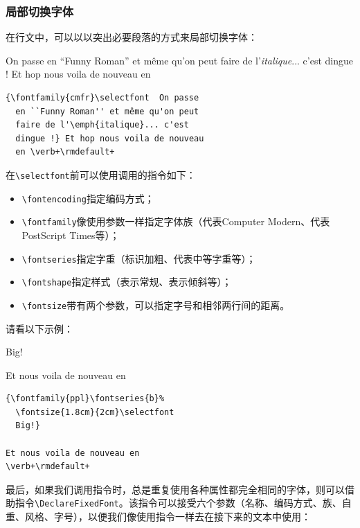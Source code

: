 \subsubsection{局部切换字体}

在行文中，可以以以突出必要段落的方式来局部切换字体：

\begin{codelist}[9.13]{
    { \selectfont  On passe
    en ``Funny Roman'' et même qu'on peut
    faire de l'\emph{italique}... c'est
    dingue !} Et hop nous voila de nouveau
    en 
}
\begin{verbatim}
{\fontfamily{cmfr}\selectfont  On passe
  en ``Funny Roman'' et même qu'on peut
  faire de l'\emph{italique}... c'est
  dingue !} Et hop nous voila de nouveau
  en \verb+\rmdefault+\end{verbatim}
\end{codelist}

在\verb|\selectfont|前可以使用调用的指令如下：

\begin{itemize}
    \item \verb|\fontencoding|指定编码方式；
    \item \verb|\fontfamily|像使用参数一样指定字体族（代表Computer Modern、代表PostScript Times等）；
    \item \verb|\fontseries|指定字重（标识加粗、代表中等字重等）；
    \item \verb|\fontshape|指定样式（表示常规、表示倾斜等）；
    \item \verb|\fontsize|带有两个参数，可以指定字号和相邻两行间的距离。
\end{itemize}

请看以下示例：

\begin{codelist}[9.14]{
    { %
  \fontsize{1.8cm}{2cm}\selectfont
  Big!}
  
Et nous voila de nouveau en
}
\begin{verbatim}
{\fontfamily{ppl}\fontseries{b}%
  \fontsize{1.8cm}{2cm}\selectfont
  Big!}

Et nous voila de nouveau en
\verb+\rmdefault+\end{verbatim}
\end{codelist}

最后，如果我们调用指令时，总是重复使用各种属性都完全相同的字体，则可以借助指令\verb|\DeclareFixedFont|。该指令可以接受六个参数（名称、编码方式、族、自重、风格、字号），以便我们像使用指令一样去在接下来的文本中使用：

